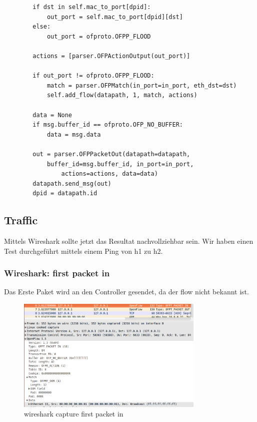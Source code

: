 \documentclass[a4,12pt]{scrartcl}
\begin{document}
\begin{lstlisting}
        if dst in self.mac_to_port[dpid]:
            out_port = self.mac_to_port[dpid][dst]
        else:
            out_port = ofproto.OFPP_FLOOD

        actions = [parser.OFPActionOutput(out_port)]

        if out_port != ofproto.OFPP_FLOOD:
            match = parser.OFPMatch(in_port=in_port, eth_dst=dst)
            self.add_flow(datapath, 1, match, actions)
		
        data = None
        if msg.buffer_id == ofproto.OFP_NO_BUFFER:
            data = msg.data

        out = parser.OFPPacketOut(datapath=datapath, 
        	buffer_id=msg.buffer_id, in_port=in_port, 
        		actions=actions, data=data)
        datapath.send_msg(out)
        dpid = datapath.id
\end{lstlisting}
\newpage

\subsection{Traffic}
Mittels Wireshark sollte jetzt das Resultat nachvollziehbar sein. Wir haben einen Test durchgeführt mittels einem Ping von h1 zu h2. 

\subsubsection{Wireshark: first packet in}
Das Erste Paket wird an den Controller gesendet, da der flow nicht bekannt ist. 
\begin{figure} [H]
	\begin{center}
	\includegraphics[width=0.80\textwidth]{./pictures/ex3_paket_in.png}
	\caption{wireshark capture first packet in}
	\label{x}
	\end{center}
\end{figure} 
\end{document}
